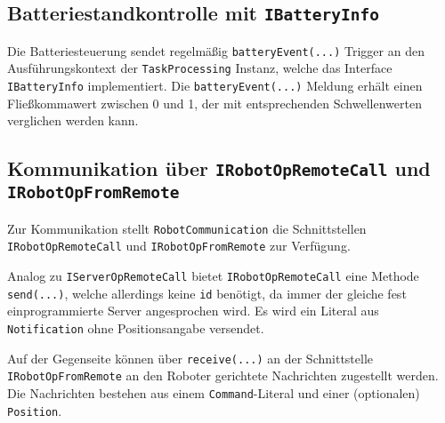 \subsection{Batteriestandkontrolle mit \texttt{IBatteryInfo}}
\label{subsec:robot_battery}

Die Batteriesteuerung sendet regelmäßig \texttt{batteryEvent(...)} Trigger an den Ausführungskontext der \texttt{TaskProcessing} Instanz, welche das Interface \texttt{IBatteryInfo} implementiert. 
Die \texttt{batteryEvent(...)} Meldung erhält einen Fließkommawert zwischen 0 und 1, der mit entsprechenden Schwellenwerten verglichen werden kann. 



\subsection{Kommunikation über \texttt{IRobotOpRemoteCall} und \texttt{IRobotOpFromRemote}}

Zur Kommunikation stellt \texttt{RobotCommunication} die Schnittstellen \texttt{IRobotOpRemoteCall} und \texttt{IRobotOpFromRemote} zur Verfügung.

Analog zu \texttt{IServerOpRemoteCall} bietet \texttt{IRobotOpRemoteCall} eine Methode \texttt{send(...)}, welche allerdings keine \texttt{id} benötigt, da immer der gleiche fest einprogrammierte Server angesprochen wird. 
Es wird ein Literal aus \texttt{Notification} ohne Positionsangabe versendet.

Auf der Gegenseite können über \texttt{receive(...)} an der Schnittstelle \texttt{IRobotOpFromRemote} an den Roboter gerichtete Nachrichten zugestellt werden. Die Nachrichten bestehen aus einem \texttt{Command}-Literal und einer (optionalen) \texttt{Position}.